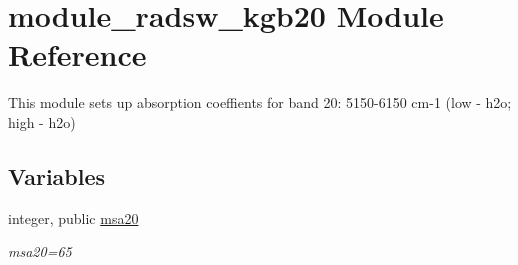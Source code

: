 \hypertarget{namespacemodule__radsw__kgb20}{}\section{module\+\_\+radsw\+\_\+kgb20 Module Reference}
\label{namespacemodule__radsw__kgb20}


This module sets up absorption coeffients for band 20\+: 5150-\/6150 cm-\/1 (low -\/ h2o; high -\/ h2o)  


\subsection*{Variables}
\begin{DoxyCompactItemize}
\item 
\mbox{\label{namespacemodule__radsw__kgb20_aadf199a3d453192a891b575d9adf8608}} 
integer, public \hyperlink{namespacemodule__radsw__kgb20_aadf199a3d453192a891b575d9adf8608}{msa20}
\begin{DoxyCompactList}\small\item\em msa20=65 \end{DoxyCompactList}\end{DoxyCompactItemize}
